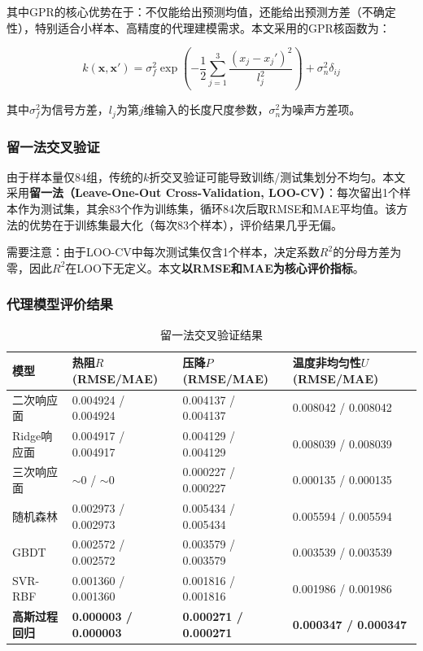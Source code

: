 \documentclass[12pt,a4paper]{ctexart}
\begin{document}
其中GPR的核心优势在于：不仅能给出预测均值，还能给出预测方差（不确定性），特别适合小样本、高精度的代理建模需求。本文采用的GPR核函数为：

\begin{equation}
k(\boldsymbol{x},\boldsymbol{x}') = \sigma_f^2 \exp\left(-\frac{1}{2}\sum_{j=1}^{3}\frac{(x_j-x_j')^2}{l_j^2}\right) + \sigma_n^2\delta_{ij}
\end{equation}

其中$\sigma_f^2$为信号方差，$l_j$为第$j$维输入的长度尺度参数，$\sigma_n^2$为噪声方差项。

\subsubsection{留一法交叉验证}

由于样本量仅84组，传统的$k$折交叉验证可能导致训练/测试集划分不均匀。本文采用\textbf{留一法（Leave-One-Out Cross-Validation, LOO-CV）}：每次留出1个样本作为测试集，其余83个作为训练集，循环84次后取RMSE和MAE平均值。该方法的优势在于训练集最大化（每次83个样本），评价结果几乎无偏。

需要注意：由于LOO-CV中每次测试集仅含1个样本，决定系数$R^2$的分母方差为零，因此$R^2$在LOO下无定义。本文\textbf{以RMSE和MAE为核心评价指标}。

\subsubsection{代理模型评价结果}

\begin{table}[H]
\centering
\caption{留一法交叉验证结果}
\footnotesize
\begin{tabular}{p{}p{}p{}p{}}
\toprule
模型 & 热阻$R$(RMSE/MAE) & 压降$P$(RMSE/MAE) & 温度非均匀性$U$(RMSE/MAE) \\
\midrule
二次响应面 & 0.004924 / 0.004924 & 0.004137 / 0.004137 & 0.008042 / 0.008042 \\
Ridge响应面 & 0.004917 / 0.004917 & 0.004129 / 0.004129 & 0.008039 / 0.008039 \\
三次响应面 & $\sim$0 / $\sim$0 & 0.000227 / 0.000227 & 0.000135 / 0.000135 \\
随机森林 & 0.002973 / 0.002973 & 0.005434 / 0.005434 & 0.005594 / 0.005594 \\
GBDT & 0.002572 / 0.002572 & 0.003579 / 0.003579 & 0.003539 / 0.003539 \\
SVR-RBF & 0.001360 / 0.001360 & 0.001816 / 0.001816 & 0.001986 / 0.001986 \\
\textbf{高斯过程回归} & \textbf{0.000003 / 0.000003} & \textbf{0.000271 / 0.000271} & \textbf{0.000347 / 0.000347} \\
\bottomrule
\end{tabular}
\end{table}
\end{document}
